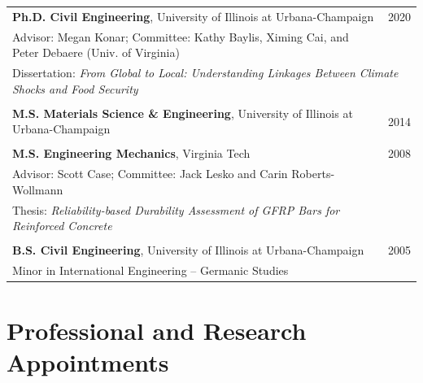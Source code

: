\documentclass{article}[12pt]
\begin{document}
		\begin{tabularx}{\textwidth}{Xr}
			\textbf{Ph.D. Civil Engineering}, University of Illinois at Urbana-Champaign & 2020 \\
			Advisor: Megan Konar; Committee: Kathy Baylis, Ximing Cai, and Peter Debaere (Univ. of Virginia) \\
			\multicolumn{2}{l}{Dissertation:  \textit{From Global to Local: Understanding Linkages Between Climate Shocks and Food Security}} \\ 
			\\
			\textbf{M.S. Materials Science \& Engineering}, University of Illinois at Urbana-Champaign & 2014 \\
			\\
			\textbf{M.S. Engineering Mechanics}, Virginia Tech & 2008 \\
			Advisor: Scott Case; Committee: Jack Lesko and Carin Roberts-Wollmann & \\
			Thesis: \textit{Reliability-based Durability Assessment of GFRP Bars for Reinforced Concrete} \\
			\\
			\textbf{B.S. Civil Engineering}, University of Illinois at Urbana-Champaign & 2005 \\
			Minor in International Engineering -- Germanic Studies
		\end{tabularx}
		
		
		\section*{Professional and Research Appointments}
		
		\vspace{-1.5em}
		
\end{document}
